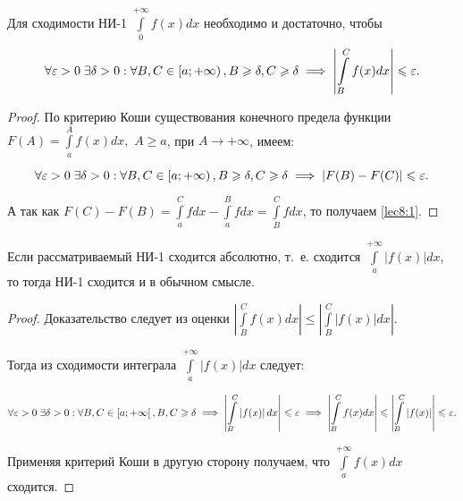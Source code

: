 \documentclass[../../main.tex]{subfiles}
\begin{document}
\begin {thm}
Для сходимости НИ-1 $\displaystyle \int\limits_{0}^{+\infty} f(x)dx$
необходимо и достаточно, чтобы 
 \begin{equation} \label{lec8:1}
  \forall \varepsilon > 0 \;  \exists \delta > 
  0 : \forall B, C \in \left[a; +\infty\right), B \geqslant \delta, C \geqslant \delta 
  \implies \left| \int\limits_{B}^{C} f(x)dx \right| \leqslant \varepsilon.
 \end{equation}
\end {thm}

\begin{proof}
По критерию Коши существования конечного предела функции
$F(A) = \displaystyle\int\limits_{a}^{A}f(x)dx,$ $A \geq a$, при $A \to +\infty$, имеем:
 
 \[\forall \varepsilon > 0 \; \exists \delta > 0 : \forall B, C \in \left[a; +\infty 
 \right), B \geqslant \delta, C \geqslant \delta \implies \left|F(B) - F(C) \right| \leqslant 
 \varepsilon.\]
 
 А так как
 $F(C) - F(B) = \displaystyle\int\limits_{a}^{C}fdx - 
 \displaystyle\int\limits_{a}^{B}fdx = \int\limits_{B}^{C}fdx$,
 то получаем \eqref{lec8:1}.
\end{proof}

\begin{crl}
 Если рассматриваемый НИ-1 сходится абсолютно, т.~е. сходится
 $\displaystyle\int\limits_{a}^{+\infty}|f(x)|dx$, то тогда НИ-1 сходится и в 
 обычном смысле.
\end{crl}

 \begin{proof}
 Доказательство следует из оценки
$\left|\displaystyle\int\limits_{B}^{C}f(x)dx \right| \leq 
\left|\displaystyle\int\limits_{B}^{C}|f(x)|dx \right|$.

Тогда из сходимости интеграла $\displaystyle\int\limits_{a}^{+\infty}\left| 
f(x) \right| dx $ следует:

\[\forall \varepsilon > 0 \; \exists \delta > 0 : \forall B, C \in \left[a; +\infty 
\right[, B, C \geqslant \delta \implies \left| \int\limits_{B}^{C} \left| f(x) 
\right| dx \right| \leqslant \varepsilon \implies \left| \int\limits_{B}^{C} f(x) dx 
\right| \leqslant \left|\int\limits_{B}^{C} \left| f(x) \right| \right| \leqslant \varepsilon.\]

Применяя критерий Коши в другую сторону получаем, что 
$\displaystyle\int\limits_{a}^{+\infty}f(x)dx$ сходится.
 \end{proof}
\end{document}
